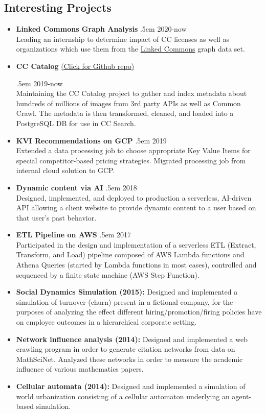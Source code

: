 \documentclass[a4paper]{article}
\makeatletter
\newcommand \brentfill {
  \tiny
  \leavevmode \cleaders 
  \hb@xt@ .5em{\hss \textperiodcentered \hss }\hfill \kern \z@
  \normalsize
}
\newcommand{\bbull}{\ding{118}}
\makeatother
\begin{document}
\subsection*{Interesting Projects \hrulefill}
\begin{itemize}
  \item[\bbull] \textbf{Linked Commons Graph Analysis} \brentfill{} 2020-now\\
    Leading an internship to determine impact of CC licenses as well as
    organizations which use them from the
    \href{http://dataviz.creativecommons.engineering/}{Linked Commons} graph
    data set.
  \item[\bbull] \textbf{CC Catalog}
    \href{https://github.com/creativecommons/cccatalog}{(Click for Github repo)}
    \brentfill{} 2019-now\\
    Maintaining the CC Catalog project to gather and index metadata about
    hundreds of millions of images from 3rd party APIs as well as Common Crawl.
    The metadata is then transformed, cleaned, and loaded into a PostgreSQL DB
    for use in CC Search.
  \item[\bbull] \textbf{KVI Recommendations on GCP} \brentfill{} 2019\\
    Extended a data processing job to choose appropriate Key Value Items for
    special competitor-based pricing strategies.  Migrated processing job from
    internal cloud solution to GCP.
  \item[\bbull] \textbf{Dynamic content via AI} \brentfill{} 2018\\
    Designed, implemented, and deployed to production a serverless, AI-driven API
    allowing a client website to provide dynamic content to a user based on
    that user's past behavior.
  \item[\bbull] \textbf{ETL Pipeline on AWS} \brentfill{} 2017\\
    Participated in the design and implementation of a serverless ETL
    (Extract, Transform, and Load) pipeline composed of AWS Lambda
    functions and Athena Queries (started by Lambda functions in most
    cases), controlled and sequenced by a finite state machine (AWS Step
    Function).
  \item[\bbull] \textbf{Social Dynamics Simulation (2015):}
    Designed and implemented a simulation of turnover (churn) present in
    a fictional company, for the purposes of analyzing the effect
    different hiring/promotion/firing policies have on employee outcomes
    in a hierarchical corporate setting.
  \item[\bbull] \textbf{Network influence analysis (2014):}
    Designed and implemented a web crawling program in order to generate
    citation networks from data on MathSciNet. Analyzed these networks in order
    to measure the academic influence of various mathematics papers.
  \item[\bbull] \textbf{Cellular automata (2014):}
    Designed and implemented a simulation of world urbanization consisting of a
    cellular automaton underlying an agent-based simulation.
\end{itemize}
\end{document}
